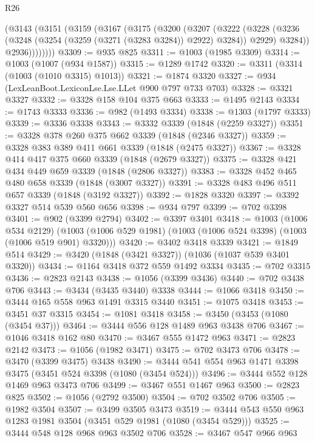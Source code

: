 \begin{lexlean}{R26}
\begin{coremodule}
      (@3143
        (@3151
          (@3159
            (@3167
              (@3175
                (@3200
                  (@3207
                    (@3222
                      (@3228
                        (@3236 (@3248 (@3254 (@3259 (@3271 (@3283 @3284)) @2922) @3284)) @2929)
                        @3284))
                    @2936))))))))
@3309 := @935 @825
@3311 := @1003 (@1985 @3309)
@3314 := @1003 (@1007 (@934 @1587))
@3315 := @1289 @1742
@3320 := @3311 (@3314 (@1003 (@1010 @3315) @1013))
@3321 := @1874 @3320
@3327 := @934 (LexLeanBoot.LexiconLse.Lse.LLet @900 @797 @733 @703)
@3328 := @3321 @3327
@3332 := @3328 @158 @104 @375 @663
@3333 := @1495 @2143
@3334 := @1743 @3333
@3336 := @982 (@1493 @3334)
@3338 := @1303 (@1797 @3333)
@3339 := @3336 @3338
@3343 := @3332 @3339 (@1848 (@2259 @3327))
@3351 := @3328 @378 @260 @375 @662 @3339 (@1848 (@2346 @3327))
@3359 := @3328 @383 @389 @411 @661 @3339 (@1848 (@2475 @3327))
@3367 := @3328 @414 @417 @375 @660 @3339 (@1848 (@2679 @3327))
@3375 := @3328 @421 @434 @449 @659 @3339 (@1848 (@2806 @3327))
@3383 := @3328 @452 @465 @480 @658 @3339 (@1848 (@3007 @3327))
@3391 := @3328 @483 @496 @511 @657 @3339 (@1848 (@3192 @3327))
@3392 := @1828 @3320
@3397 := @3392 @3327 @514 @539 @560 @656
@3398 := @934 @797
@3399 := @702 @3398
@3401 := @902 (@3399 @2794)
@3402 := @3397 @3401
@3418 := @1003
    (@1006 @534 @2129)
    (@1003 (@1006 @529 @1981) (@1003 (@1006 @524 @3398) (@1003 (@1006 @519 @901) @3320)))
@3420 := @3402 @3418 @3339
@3421 := @1849 @514
@3429 := @3420 (@1848 (@3421 @3327)) (@1036 (@1037 @539 @3401 @3320))
@3434 := @1164 @3418 @372 @559 @1492 @3334
@3435 := @702 @3315
@3436 := @2823 @2143
@3438 := @1056 (@3399 @3436)
@3440 := @702 @3438 @706
@3443 := @3434 (@3435 @3440) @3338
@3444 := @1066 @3418
@3450 := @3444 @165 @558 @963 @1491 @3315 @3440
@3451 := @1075 @3418
@3453 := @3451 @37 @3315
@3454 := @1081 @3418
@3458 := @3450 (@3453 (@1080 (@3454 @37)))
@3464 := @3444 @556 @128 @1489 @963 @3438 @706
@3467 := @1046 @3418 @162 @80
@3470 := @3467 @555 @1472 @963
@3471 := @2823 @2142
@3473 := @1056 (@1982 @3471)
@3475 := @702 @3473 @706
@3478 := @3470 (@3399 @3475) @3438
@3490 := @3444 @541 @554 @963 @1471 @3398 @3475 (@3451 @524 @3398 (@1080 (@3454 @524)))
@3496 := @3444 @552 @128 @1469 @963 @3473 @706
@3499 := @3467 @551 @1467 @963
@3500 := @2823 @825
@3502 := @1056 (@2792 @3500)
@3504 := @702 @3502 @706
@3505 := @1982 @3504
@3507 := @3499 @3505 @3473
@3519 := @3444 @543 @550 @963 @1283 @1981 @3504 (@3451 @529 @1981 (@1080 (@3454 @529)))
@3525 := @3444 @548 @128 @968 @963 @3502 @706
@3528 := @3467 @547 @966 @963

\end{coremodule}
\end{lexlean}
